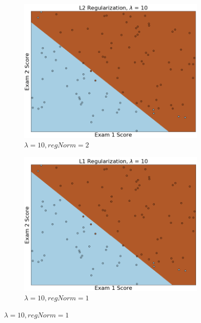 \documentclass{article}
\begin{document}
\begin{enumerate}
    	\begin{figure}[h!]
     	\centering
     	\begin{subfigure}[b]{0.44\textwidth}
         	\centering
         	\includegraphics[width=\textwidth]
         	{Problem_1_3/fig_L2_5.png}
         	\caption{$\lambda = 10, regNorm = 2$}
         	\label{fig:L2_5}
     	\end{subfigure}
     	\hfill
     	\begin{subfigure}[b]{0.44\textwidth}
         	\centering
         	\includegraphics[width=\textwidth]
         	{Problem_1_3/fig_L1_5.png}
         	\caption{$\lambda = 10, regNorm = 1$}
         	\label{fig:L1_5}
     	\end{subfigure}
		\end{figure}
		
    	\end{enumerate}
\end{document}
